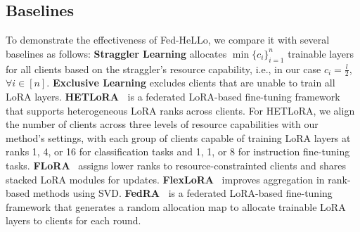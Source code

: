 \documentclass[lettersize,journal]{IEEEtran}
\begin{document}
\subsection{Baselines}
To demonstrate the effectiveness of Fed-HeLLo, we compare it with several baselines as follows:
\textbf{Straggler Learning} allocates $\min\{c_i\}_{i=1}^n$ trainable layers for all clients based on the straggler's resource capability, i.e., in our case $c_i=\frac{l}{2}$, $\forall i\in[n]$.
\textbf{Exclusive Learning} excludes clients that are unable to train all LoRA layers.
\textbf{HETLoRA~\cite{cho2023heterogeneous}} is a federated LoRA-based fine-tuning framework that supports heterogeneous LoRA ranks across clients. 
{For HETLoRA, we align the number of clients across three levels of resource capabilities with our method's settings, with each group of clients capable of training LoRA layers at ranks 1, 4, or 16 for classification tasks and 1, 1, or 8 for instruction fine-tuning tasks.
{\textbf{FLoRA}}~\cite{wang2024flora} assigns lower ranks to resource-constrainted clients and shares stacked LoRA modules for updates.
{\textbf{FlexLoRA}}~\cite{bai2024flexlora} improves aggregation in rank-based methods using SVD.
}
\textbf{FedRA~\cite{su2023fedra}} is a federated LoRA-based fine-tuning framework that generates a random allocation map to allocate trainable LoRA layers to clients for each round. 
\end{document}
